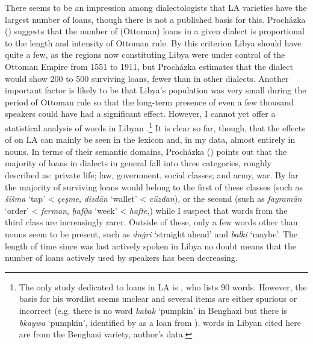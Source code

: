 \documentclass[output=paper]{langsci/langscibook}
\begin{document}
  There seems to be an impression among dialectologists that LA varieties have the largest number of  loans, though there is not a published basis for this. Procházka (\citeyear[191]{Procházka2005}) suggests that the number of (Ottoman)  loans in a given  dialect is proportional to the length and intensity of Ottoman rule. By this criterion Libya should have quite a few, as the regions now constituting Libya were under control of the Ottoman Empire from 1551 to 1911, but Procházka estimates that the dialect would show 200 to 500 surviving loans, fewer than in other dialects. Another important factor is likely to be that Libya’s population was very small during the period of Ottoman rule so that the long-term presence of even a few thousand  speakers could have had a significant effect. However, I cannot yet offer a statistical analysis of  words in Libyan .\footnote{The only study dedicated to  loans in LA is \citet{Türkmen1988}, who lists 90 words. However, the basis for his wordlist seems unclear and  several items are either spurious or incorrect (e.g. there is no word \textit{kabak} ‘pumpkin’ in Benghazi  but there is \textit{bkaywa} ‘pumpkin’, identified by \citet{Souag2013lexical} as a loan from ).  words in Libyan  cited here are from the Benghazi variety, author’s data.} It is clear so far, though, that the effects of  on LA can mainly be seen in the lexicon and, in my data, almost entirely in nouns. In terms of their semantic domains, Procházka (\citeyear[192]{Procházka2005}) points out that the majority of  loans in  dialects in general fall into three categories, roughly described as: private life; law, government, social classes; and army, war. By far the majority of surviving loans would belong to the first of these classes (such as \textit{šīšma} ‘tap’ < \textit{çeşme}, \textit{dizdān} ‘wallet’ < \textit{cüzdan}), or the second (such as \textit{fayramān} ‘order’ < \textit{ferman}, \textit{ḥafð̣a} ‘week’ < \textit{hafte},) while I suspect that words from the third class are increasingly rarer. Outside of these, only a few words other than nouns seem to be present, such as \textit{du\.gri} ‘straight ahead’ and \textit{balki} ‘maybe’. The length of time since  was last actively spoken in Libya no doubt means that the number of  loans actively used by speakers has been decreasing.
\end{document}
